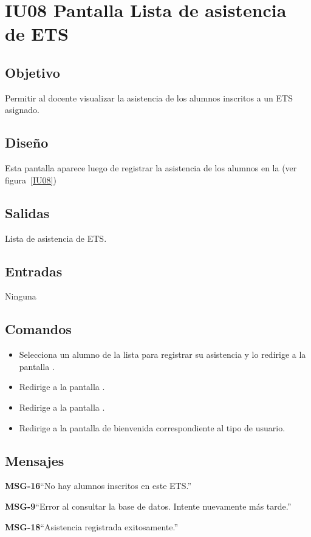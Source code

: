 \section{IU08 Pantalla Lista de asistencia de ETS}

\subsection{Objetivo}
Permitir al docente visualizar la asistencia de los alumnos inscritos a un ETS asignado.

\subsection{Diseño}
Esta pantalla aparece luego de registrar la asistencia de los alumnos en la  (ver figura~\ref{IU08})


\subsection{Salidas}
Lista de asistencia de ETS.

\subsection{Entradas}
Ninguna

\subsection{Comandos}
\begin{itemize}
	\item {} Selecciona un alumno de la lista para registrar su asistencia y lo redirige a la pantalla .
	\item {} Redirige a la pantalla .
    \item {} Redirige a la pantalla .
    \item {} Redirige a la pantalla de bienvenida correspondiente al tipo de usuario.
\end{itemize}

\subsection{Mensajes}

\begin{Citemize}
	\item {\bf MSG-16}{``No hay alumnos inscritos en este ETS.''}
	\item {\bf MSG-9}{``Error al consultar la base de datos. Intente nuevamente más tarde.''}
	\item {\bf MSG-18}{``Asistencia registrada exitosamente.''}  
\end{Citemize}